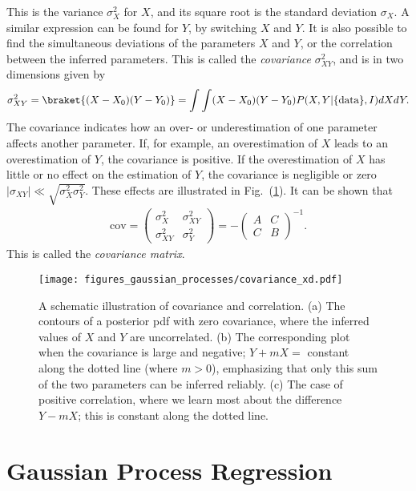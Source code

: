 \documentclass[twoside,english]{uiofysmaster}
\begin{document}
This is the variance $\sigma_X^2$ for $X$, and its square root is the standard deviation $\sigma_X$. A similar expression can be found for $Y$, by switching $X$ and $Y$. It is also possible to find the simultaneous deviations of the parameters $X$ and $Y$, or the correlation between the inferred parameters. This is called the \textit{covariance} $\sigma_{XY}^2$, and is in two dimensions given by
\begin{align}
\sigma_{XY}^2 = \braket{(X - X_0) (Y - Y_0)} =\int \int (X - X_0) (Y - Y_0) P (X, Y | \{\text{data}\}, I) dXdY.
\end{align}
The covariance indicates how an over- or underestimation of one parameter affects another parameter. If, for example, an overestimation of $X$ leads to an overestimation of $Y$, the covariance is positive. If the overestimation of $X$ has little or no effect on the estimation of $Y$, the covariance is negligible or zero $|\sigma_{XY}| \ll \sqrt{\sigma_X^2 \sigma_Y^2}$. These effects are illustrated in Fig.\ (\ref{Fig:: gaussian process : Covariance illustrated}). It can be shown that \cite{sivia2006data}
\begin{align}
\text{cov} = 
\begin{pmatrix}
\sigma_X^2 & \sigma_{XY}^2\\
\sigma_{XY}^2 & \sigma_Y^2
\end{pmatrix}
= - \begin{pmatrix}
A & C\\
C & B
\end{pmatrix}^{-1}.
\end{align}
This is called the \textit{covariance matrix}.

\begin{figure}
\centering
\texttt{[image: figures\_gaussian\_processes/covariance\_xd.pdf]}
\caption{A schematic illustration of covariance and correlation. (a) The contours of a posterior pdf with zero covariance, where the inferred values of $X$ and $Y$ are uncorrelated. (b) The corresponding plot when the covariance is large and negative; $Y + mX =$ constant along the dotted line (where $m > 0$), emphasizing that only this sum of the two parameters can be inferred reliably. (c) The case of positive correlation, where we learn most about the difference $Y − mX$; this is constant along the dotted line.}
\label{Fig:: gaussian process : Covariance illustrated}
\end{figure}


\section{Gaussian Process Regression}
\end{document}
